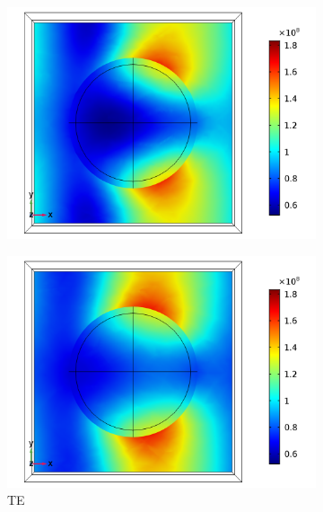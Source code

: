 \begin{figure}[htb!]
    \begin{subfigure}{0.32\textwidth}
        \centering
        \includegraphics[width=\linewidth]{figures/ch4/S5A/FieldDistribution/Sample5A_TE_Slice@z=-05t_wl=390_notitle.png}
   \end{subfigure}
   \begin{subfigure}{0.32\textwidth}
        \centering
        \includegraphics[width=\linewidth]{figures/ch4/S5A/FieldDistribution/Sample5A_TE_Slice@z=-05t_wl=450_notitle.png}
        \caption{TE}
        \vspace{-0.7cm}
   \end{subfigure}
   \begin{subfigure}{0.32\textwidth}

\end{subfigure}
\end{figure}
